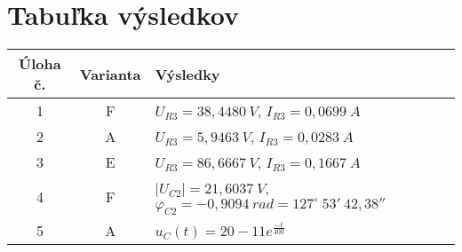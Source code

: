 \section{Tabuľka výsledkov}
\begin{table}[H]
\begin{center}
  \begin{tabular}{|c|c|l|}
    \hline
    Úloha č. & Varianta & Výsledky \\ \hline
    1 & F & $U_{R3} = 38,4480~V$, $I_{R3} = 0,0699~A$\\ \hline
    2 & A & $U_{R3} = 5,9463~V$, $I_{R3} = 0,0283~A$ \\ \hline
    3 & E & $U_{R3} = 86,6667~V$, $I_{R3} = 0,1667~A$  \\ \hline
    4 & F & $|U_{C2}| = 21,6037~V$, $\varphi_{C2} = -0,9094~rad = 127^\circ~53'~42,38'' $ \\ \hline
    5 & A & $u_{C} (t) = 20 - 11e^{\frac{-t}{400}}$ \\ 
    \hline
  \end{tabular}
\end{center}
\end{table}

